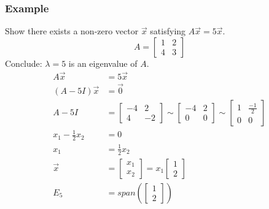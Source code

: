 \documentclass{math}
\begin{document}
\subsubsection*{Example}
Show there exists a non-zero vector \( \vec{x} \) satisfying \( A\vec{x} =
5\vec{x} \).
\[ A = \begin{bmatrix}1 & 2 \\ 4 & 3\end{bmatrix} \]
Conclude: \( \lambda = 5 \) is an eigenvalue of \( A \).
\begin{align*}
  A\vec{x} &= 5\vec{x} \\
  (A-5I)\vec{x} &= \vec{0} \\
  A-5I &= \begin{bmatrix}-4 & 2 \\ 4 & -2\end{bmatrix}
    \sim \begin{bmatrix}-4 & 2 \\ 0 & 0\end{bmatrix}
    \sim \begin{bmatrix}1 & \frac{-1}{2} \\ 0 & 0\end{bmatrix} \\
  x_1-\frac{1}{2}x_2 &= 0 \\
  x_1 &= \frac{1}{2}x_2 \\
  \vec{x} &= \begin{bmatrix}x_1 \\ x_2\end{bmatrix}
    = x_1\begin{bmatrix}1 \\ 2\end{bmatrix} \\
  E_5 &= span\left(\begin{bmatrix}1 \\ 2\end{bmatrix}\right)
\end{align*}
\end{document}
